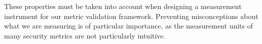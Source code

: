 These properties must be taken into account when designing a measurement instrument for our metric validation framework. Preventing misconceptions about what we are measuring is of particular importance, as the measurement units of many security metrics are not particularly intuitive. 






